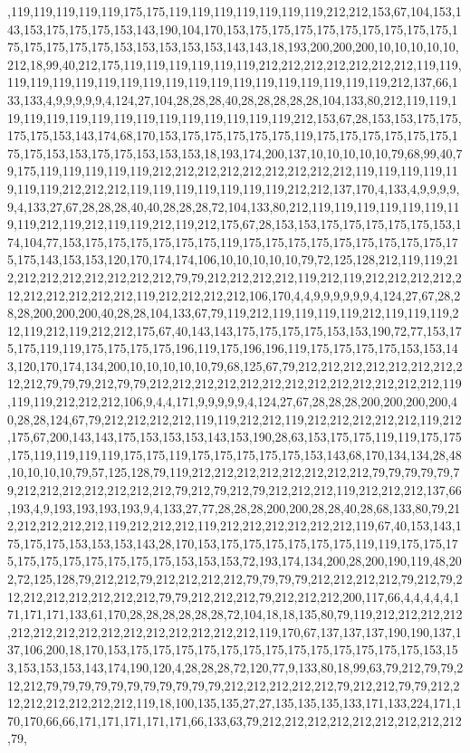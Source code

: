 ,119,119,119,119,119,175,175,119,119,119,119,119,119,119,212,212,153,67,104,153,143,153,175,175,175,153,143,190,104,170,153,175,175,175,175,175,175,175,175,175,175,175,175,175,175,153,153,153,153,153,143,143,18,193,200,200,200,10,10,10,10,10,212,18,99,40,212,175,119,119,119,119,119,119,212,212,212,212,212,212,212,119,119,119,119,119,119,119,119,119,119,119,119,119,119,119,119,119,119,119,212,137,66,133,133,4,9,9,9,9,9,4,124,27,104,28,28,28,40,28,28,28,28,28,104,133,80,212,119,119,119,119,119,119,119,119,119,119,119,119,119,119,119,212,153,67,28,153,153,175,175,175,175,153,143,174,68,170,153,175,175,175,175,175,119,175,175,175,175,175,175,175,175,153,153,175,175,153,153,153,18,193,174,200,137,10,10,10,10,10,79,68,99,40,79,175,119,119,119,119,119,212,212,212,212,212,212,212,212,212,119,119,119,119,119,119,119,212,212,212,119,119,119,119,119,119,119,212,212,137,170,4,133,4,9,9,9,9,9,4,133,27,67,28,28,28,40,40,28,28,28,72,104,133,80,212,119,119,119,119,119,119,119,119,212,119,212,119,119,212,119,212,175,67,28,153,153,175,175,175,175,175,153,174,104,77,153,175,175,175,175,175,175,119,175,175,175,175,175,175,175,175,175,175,175,143,153,153,120,170,174,174,106,10,10,10,10,10,79,72,125,128,212,119,119,212,212,212,212,212,212,212,212,79,79,212,212,212,212,119,212,119,212,212,212,212,212,212,212,212,212,212,119,212,212,212,212,106,170,4,4,9,9,9,9,9,9,4,124,27,67,28,28,28,200,200,200,40,28,28,104,133,67,79,119,212,119,119,119,119,212,119,119,119,212,119,212,119,212,212,175,67,40,143,143,175,175,175,175,153,153,190,72,77,153,175,175,119,119,175,175,175,175,196,119,175,196,196,119,175,175,175,175,153,153,143,120,170,174,134,200,10,10,10,10,10,79,68,125,67,79,212,212,212,212,212,212,212,212,212,79,79,79,212,79,79,212,212,212,212,212,212,212,212,212,212,212,212,212,119,119,119,212,212,212,106,9,4,4,171,9,9,9,9,9,4,124,27,67,28,28,28,200,200,200,200,40,28,28,124,67,79,212,212,212,212,119,119,212,212,119,212,212,212,212,212,119,212,175,67,200,143,143,175,153,153,153,143,153,190,28,63,153,175,175,119,119,175,175,175,119,119,119,119,175,175,119,175,175,175,175,175,153,143,68,170,134,134,28,48,10,10,10,10,79,57,125,128,79,119,212,212,212,212,212,212,212,212,79,79,79,79,79,79,212,212,212,212,212,212,212,79,212,79,212,79,212,212,212,119,212,212,212,137,66,193,4,9,193,193,193,193,9,4,133,27,77,28,28,28,200,200,28,28,40,28,68,133,80,79,212,212,212,212,212,119,212,212,212,119,212,212,212,212,212,212,119,67,40,153,143,175,175,175,153,153,153,143,28,170,153,175,175,175,175,175,175,119,119,175,175,175,175,175,175,175,175,175,175,153,153,153,72,193,174,134,200,28,200,190,119,48,202,72,125,128,79,212,212,79,212,212,212,212,79,79,79,79,212,212,212,212,79,212,79,212,212,212,212,212,212,212,79,79,212,212,212,79,212,212,212,200,117,66,4,4,4,4,4,171,171,171,133,61,170,28,28,28,28,28,28,72,104,18,18,135,80,79,119,212,212,212,212,212,212,212,212,212,212,212,212,212,212,212,119,170,67,137,137,137,190,190,137,137,106,200,18,170,153,175,175,175,175,175,175,175,175,175,175,175,175,175,153,153,153,153,153,143,174,190,120,4,28,28,28,72,120,77,9,133,80,18,99,63,79,212,79,79,212,212,79,79,79,79,79,79,79,79,79,79,79,212,212,212,212,212,79,212,212,79,79,212,212,212,212,212,212,212,119,18,100,135,135,27,27,135,135,135,133,171,133,224,171,170,170,66,66,171,171,171,171,171,66,133,63,79,212,212,212,212,212,212,212,212,212,79,